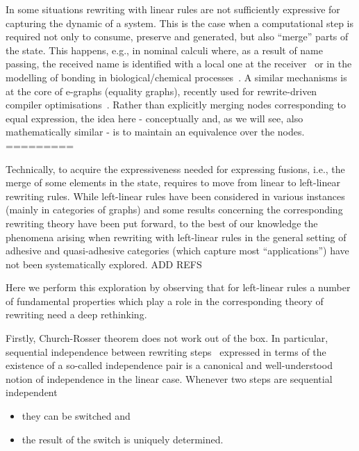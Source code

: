 \documentclass[a4paper,UKenglish,cleveref,pdftex, thm-restate,numberwithinsect]{lipics}
\begin{document}
In some situations rewriting with linear rules are not sufficiently
expressive for capturing the dynamic of a system. This is the case
when a computational step is required not only to consume, preserve
and generated, but also ``merge'' parts of the state. This happens,
e.g., in nominal calculi where, as a result of name passing, the
received name is identified with a local one at the
receiver~\cite{CVY:ESSPE,Gad07} or in the modelling of bonding in
biological/chemical processes~\cite{PUY:MBPE}. A similar mechanisms is
at the core of e-graphs (equality graphs), recently used for
rewrite-driven compiler optimisations~\cite{WNW:egg}. Rather than
explicitly merging nodes corresponding to equal expression, the idea
here - conceptually and, as we will see, also mathematically similar -
is to maintain an equivalence
over the nodes.  \\
=========

Technically, to acquire the expressiveness needed for expressing
fusions, i.e., the merge of some elements in the state, requires to
move from linear to left-linear rewriting rules. While left-linear
rules have been considered in various instances (mainly in categories
of graphs) and some results concerning the corresponding rewriting
theory have been put forward, to the best of our knowledge the
phenomena arising when rewriting with left-linear rules in the general
setting of adhesive and quasi-adhesive categories (which capture most
``applications'') have not been systematically explored. ADD REFS

Here we perform this exploration by observing that for left-linear
rules a number of fundamental properties which play a role in the
corresponding theory of rewriting need a deep rethinking.

Firstly, Church-Rosser theorem does not work out of the box. In
particular, sequential independence between rewriting steps~\cite{}
expressed in terms of the existence of a so-called independence pair
is a canonical and well-understood notion of independence in the
linear case.  Whenever two steps are sequential independent
\begin{itemize}
\item they can be switched and 
\item the result of the switch is uniquely determined.
\end{itemize}
\end{document}
